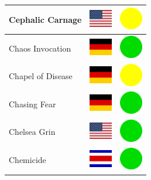 \documentclass[12pt, a4paper, twoside]{report}
\begin{document}
\begin{center}
\begin{longtable}{|p{5cm}|p{2cm}|p{2cm}|}
 Cephalic Carnage                                           & \includegraphics[width=1cm]{../img/flags/us} &   \includegraphics[width=1cm]{../likes/m} \\ \hline
 Chaos Invocation                                           & \includegraphics[width=1cm]{../img/flags/de} &   \includegraphics[width=1cm]{../likes/y} \\ \hline
 Chapel of Disease                                          & \includegraphics[width=1cm]{../img/flags/de} &   \includegraphics[width=1cm]{../likes/m} \\ \hline
 Chasing Fear                                               & \includegraphics[width=1cm]{../img/flags/de} &   \includegraphics[width=1cm]{../likes/y} \\ \hline
 Chelsea Grin                                               & \includegraphics[width=1cm]{../img/flags/us} &   \includegraphics[width=1cm]{../likes/y} \\ \hline
 Chemicide                                                  & \includegraphics[width=1cm]{../img/flags/cr} &   \includegraphics[width=1cm]{../likes/y} \\ \hline

\end{longtable}
\end{center}
\end{document}
